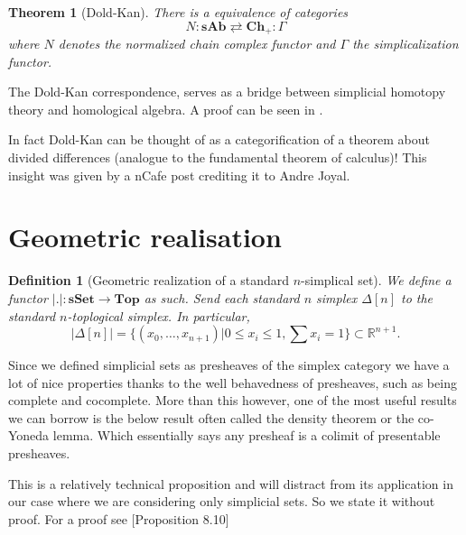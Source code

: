 \documentclass[12pt]{report}
\numberwithin{equation}{section}
\newcommand{\R}{\mathbb{R}}
\newtheorem{theorem}[dummy]{Theorem}
\newtheorem{definition}[dummy]{Definition}
\begin{document}
	
	
	
	\begin{theorem}[Dold-Kan]
		There is a equivalence of categories $$N:\mathbf{sAb}\rightleftarrows \mathbf{Ch}_+: \Gamma$$ where $N$ denotes the normalized chain complex functor and $\Gamma$ the simplicalization functor.
	\end{theorem}
	
	The Dold-Kan correspondence, serves as a bridge between simplicial homotopy theory and homological algebra. A proof can be seen in \cite{Goerss_Jardine_2009}.	
	
	In fact Dold-Kan can be thought of as a categorification of a theorem about divided differences (analogue to the fundamental theorem of calculus)! This insight was given by a nCafe post \cite{ncafedk} crediting it to Andre Joyal.
	
	\section{Geometric realisation}
	

	\begin{definition}[Geometric realization of a standard $n$-simplical set]
		We define a functor $|.|:\mathbf{sSet} \to \mathbf{Top}$ as such. Send each standard $n$ simplex $\Delta[n]$ to the standard $n$-toplogical simplex. In particular,
		\[ |\Delta[n]|=\{ (x_0,\dots,x_{n+1}) | 0 \leq x_i \leq 1, \sum x_i=1 \} \subset \R^{n+1}. \]
	\end{definition}
	
		Since we defined simplicial sets as presheaves of the simplex category we have a lot of nice properties thanks to the well behavedness of presheaves, such as being complete and cocomplete. More than this however, one of the most useful results we can borrow is the below result often called the density theorem or the co-Yoneda lemma. Which essentially says any presheaf is a colimit of presentable presheaves.
	
	This is a relatively technical proposition and will distract from its application in our case where we are considering only simplicial sets. So we state it without proof. For a proof see \cite{Awodey}[Proposition 8.10]	
	
\end{document}
